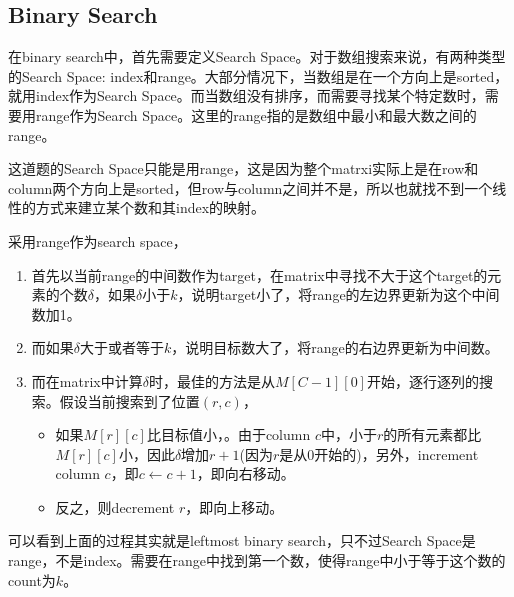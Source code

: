 \subsection{Binary Search}
在binary search中，首先需要定义Search Space。对于数组搜索来说，有两种类型的Search Space: index和range。大部分情况下，当数组是在一个方向上是sorted，就用index作为Search Space。而当数组没有排序，而需要寻找某个特定数时，需要用range作为Search Space。这里的range指的是数组中最小和最大数之间的range。
\par
这道题的Search Space只能是用range，这是因为整个matrxi实际上是在row和column两个方向上是sorted，但row与column之间并不是，所以也就找不到一个线性的方式来建立某个数和其index的映射。
\par
采用range作为search space，
\begin{enumerate}
\item 首先以当前range的中间数作为target，在matrix中寻找不大于这个target的元素的个数$\delta$，如果$\delta$小于$k$，说明target小了，将range的左边界更新为这个中间数加1。
\item 而如果$\delta$大于或者等于$k$，说明目标数大了，将range的右边界更新为中间数。
\item 而在matrix中计算$\delta$时，最佳的方法是从$M[C-1][0]$开始，逐行逐列的搜索。假设当前搜索到了位置$(r,c)$，
\begin{itemize}
\item 如果$M[r][c]$比目标值小，。由于column $c$中，小于$r$的所有元素都比$M[r][c]$小，因此$\delta$增加$r+1$(因为$r$是从0开始的)，另外，increment column $c$，即$c\gets c+1$，即向右移动。
\item 反之，则decrement $r$，即向上移动。
\end{itemize}
\end{enumerate}
可以看到上面的过程其实就是leftmost binary search，只不过Search Space是range，不是index。需要在range中找到第一个数，使得range中小于等于这个数的count为$k$。


